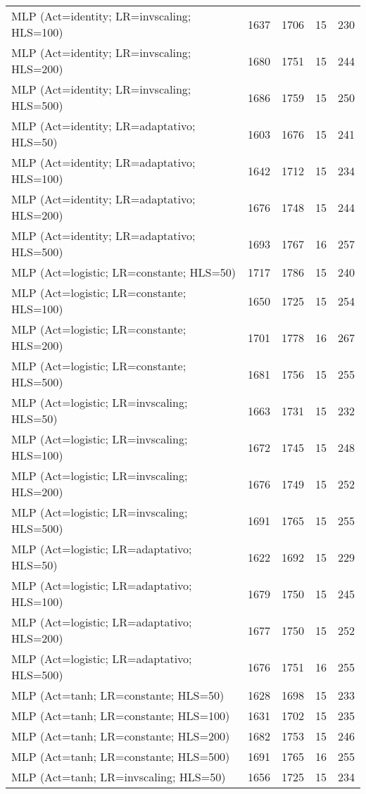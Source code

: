 \begin{center}
\begin{longtable}{|l|l|l|l|l|}
MLP (Act=identity; LR=invscaling; HLS=100) & 1637 & 1706 & 15 & 230 \\
MLP (Act=identity; LR=invscaling; HLS=200) & 1680 & 1751 & 15 & 244 \\
MLP (Act=identity; LR=invscaling; HLS=500) & 1686 & 1759 & 15 & 250 \\
MLP (Act=identity; LR=adaptativo; HLS=50) & 1603 & 1676 & 15 & 241 \\
MLP (Act=identity; LR=adaptativo; HLS=100) & 1642 & 1712 & 15 & 234 \\
MLP (Act=identity; LR=adaptativo; HLS=200) & 1676 & 1748 & 15 & 244 \\
MLP (Act=identity; LR=adaptativo; HLS=500) & 1693 & 1767 & 16 & 257 \\
MLP (Act=logistic; LR=constante; HLS=50) & 1717 & 1786 & 15 & 240 \\
MLP (Act=logistic; LR=constante; HLS=100) & 1650 & 1725 & 15 & 254 \\
MLP (Act=logistic; LR=constante; HLS=200) & 1701 & 1778 & 16 & 267 \\
MLP (Act=logistic; LR=constante; HLS=500) & 1681 & 1756 & 15 & 255 \\
MLP (Act=logistic; LR=invscaling; HLS=50) & 1663 & 1731 & 15 & 232 \\
MLP (Act=logistic; LR=invscaling; HLS=100) & 1672 & 1745 & 15 & 248 \\
MLP (Act=logistic; LR=invscaling; HLS=200) & 1676 & 1749 & 15 & 252 \\
MLP (Act=logistic; LR=invscaling; HLS=500) & 1691 & 1765 & 15 & 255 \\
MLP (Act=logistic; LR=adaptativo; HLS=50) & 1622 & 1692 & 15 & 229 \\
MLP (Act=logistic; LR=adaptativo; HLS=100) & 1679 & 1750 & 15 & 245 \\
MLP (Act=logistic; LR=adaptativo; HLS=200) & 1677 & 1750 & 15 & 252 \\
MLP (Act=logistic; LR=adaptativo; HLS=500) & 1676 & 1751 & 16 & 255 \\
MLP (Act=tanh; LR=constante; HLS=50) & 1628 & 1698 & 15 & 233 \\
MLP (Act=tanh; LR=constante; HLS=100) & 1631 & 1702 & 15 & 235 \\
MLP (Act=tanh; LR=constante; HLS=200) & 1682 & 1753 & 15 & 246 \\
MLP (Act=tanh; LR=constante; HLS=500) & 1691 & 1765 & 16 & 255 \\
MLP (Act=tanh; LR=invscaling; HLS=50) & 1656 & 1725 & 15 & 234 \\

\end{longtable}
\end{center}
